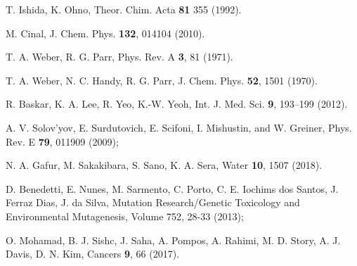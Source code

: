 \begin{thebibliography}{9}
T. Ishida, K. Ohno, 
Theor. Chim. Acta \textbf{81} 355 (1992).

M. Cinal,
J. Chem. Phys. \textbf{132}, 014104 (2010).

T. A. Weber, R. G. Parr, 
Phys. Rev. A \textbf{3}, 81 (1971).

T. A. Weber, N. C. Handy, R. G. Parr, 
J. Chem. Phys. \textbf{52}, 1501 (1970).


R. Baskar, K. A. Lee, R. Yeo, K.-W. Yeoh,
Int. J. Med. Sci. \textbf{9}, 193--199 (2012).

A. V. Solov'yov, E. Surdutovich, E. Scifoni, I. Mishustin, and 
W. Greiner, 
Phys. Rev. E \textbf{79}, 011909 (2009);

N. A. Gafur, M.  Sakakibara, S. Sano, K. A. Sera, 
Water \textbf{10}, 1507 (2018).

D. Benedetti, E. Nunes, M. Sarmento, C. Porto, C. E. Iochims dos Santos, 
J. Ferraz Dias, J. da Silva,
Mutation Research/Genetic Toxicology and Environmental Mutagenesis,
Volume 752, 28-33 (2013);

O. Mohamad, B. J. Sishc, J. Saha, A. Pompos, A. Rahimi, M. D. Story, 
A. J. Davis, D. N. Kim, 
Cancers \textbf{9}, 66 (2017).


\end{thebibliography}
